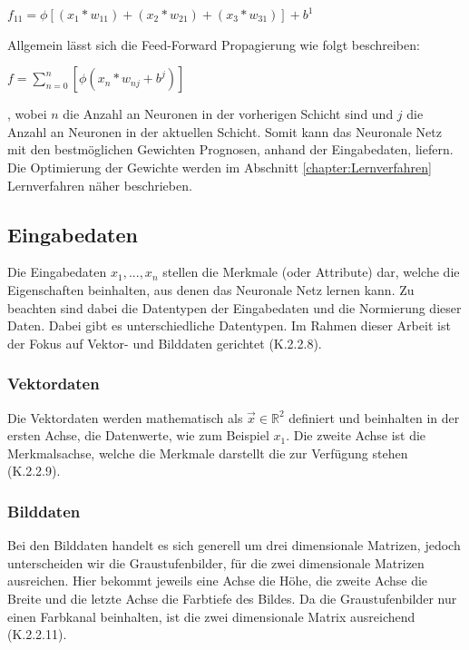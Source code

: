 \documentclass[12pt]{scrreprt}
\begin{document}
\begin{center}
	$f_{11} =  \phi [(x_{1}* w_{11}) +( x_{2}* w_{21}) + (x_{3}* w_{31})]  + b^{1}$
\end{center}

Allgemein lässt sich die Feed-Forward Propagierung wie folgt beschreiben:

\begin{center}
	$f = \sum^{n}_{n=0} [ \phi (x_{n} * w_{nj} + b^{j})]$
\end{center}

, wobei $n$ die Anzahl an Neuronen in der vorherigen Schicht sind und $j$ die Anzahl an Neuronen in der aktuellen Schicht. Somit kann das Neuronale Netz mit den bestmöglichen Gewichten Prognosen, anhand der Eingabedaten, liefern. Die Optimierung der Gewichte werden im Abschnitt \ref{chapter:Lernverfahren} Lernverfahren näher beschrieben.\\
	
\subsection{Eingabedaten}
Die Eingabedaten $x_{1}, ..., x_{n}$ stellen die Merkmale (oder Attribute) dar, welche die Eigenschaften beinhalten, aus denen das Neuronale Netz lernen kann. Zu beachten sind dabei die Datentypen der Eingabedaten und die Normierung dieser Daten. Dabei gibt es unterschiedliche Datentypen. Im Rahmen dieser Arbeit ist der Fokus auf Vektor- und Bilddaten gerichtet \cite{Chollet2018} (K.2.2.8). 

\subsubsection{Vektordaten}

Die Vektordaten werden mathematisch als $ \overrightarrow{x} \in \mathbb{R}^{2}$ definiert und beinhalten in der ersten Achse, die Datenwerte, wie zum Beispiel $x_{1}$. Die zweite Achse ist die Merkmalsachse, welche die Merkmale darstellt die zur Verfügung stehen  \cite{Chollet2018} (K.2.2.9).

\subsubsection{Bilddaten}

Bei den Bilddaten handelt es sich generell um drei dimensionale Matrizen, jedoch unterscheiden wir die Graustufenbilder, für die zwei dimensionale Matrizen ausreichen. Hier bekommt jeweils eine Achse die Höhe, die zweite Achse die Breite und die letzte Achse die Farbtiefe des Bildes. Da die Graustufenbilder nur einen Farbkanal beinhalten, ist die zwei dimensionale Matrix ausreichend \cite{Chollet2018} (K.2.2.11).
\end{document}
